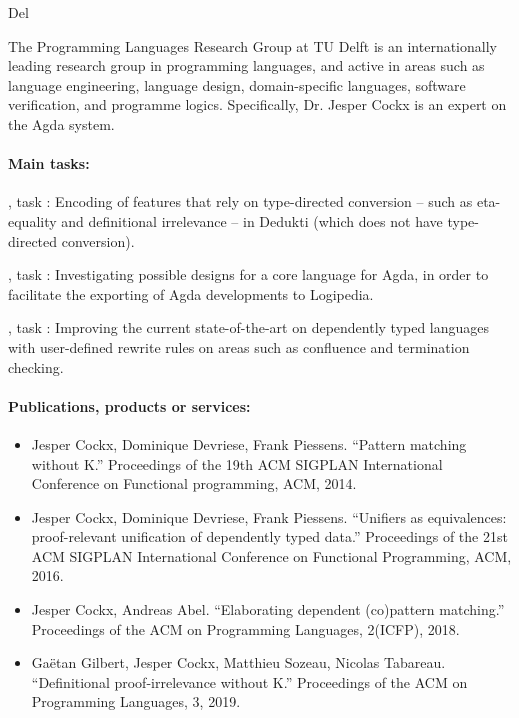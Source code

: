 \begin{sitedescription}{Del}


The Programming Languages Research Group at TU Delft is an
internationally leading research group in programming languages, and
active in areas such as language engineering, language design,
domain-specific languages, software verification, and programme logics.
Specifically, Dr. Jesper Cockx is an expert on the Agda system.

\paragraph{Main tasks:}

\begin{compactitem}
  \item {}, task :
  Encoding of features that rely on type-directed conversion -- such
  as eta-equality and definitional irrelevance -- in Dedukti (which
  does not have type-directed conversion).
  \item {}, task :
  Investigating possible designs for a core language for Agda, in
  order to facilitate the exporting of Agda developments to Logipedia.
  \item {}, task :
  Improving the current state-of-the-art on dependently typed
  languages with user-defined rewrite rules on areas such as
  confluence and termination checking.
\end{compactitem}

\paragraph{Publications, products or services:}

\begin{itemize}
  \item Jesper Cockx, Dominique Devriese, Frank Piessens. ``Pattern
  matching without K.'' Proceedings of the 19th ACM SIGPLAN
  International Conference on Functional programming, ACM, 2014.
  \item Jesper Cockx, Dominique Devriese, Frank Piessens. ``Unifiers
  as equivalences: proof-relevant unification of dependently typed
  data.'' Proceedings of the 21st ACM SIGPLAN International Conference
  on Functional Programming, ACM, 2016.
  \item Jesper Cockx, Andreas Abel. ``Elaborating dependent
  (co)pattern matching.'' Proceedings of the ACM on Programming
  Languages, 2(ICFP), 2018.
  \item Gaëtan Gilbert, Jesper Cockx, Matthieu Sozeau, Nicolas
  Tabareau. ``Definitional proof-irrelevance without K.'' Proceedings
  of the ACM on Programming Languages, 3, 2019.
\end{itemize}


\end{sitedescription}
